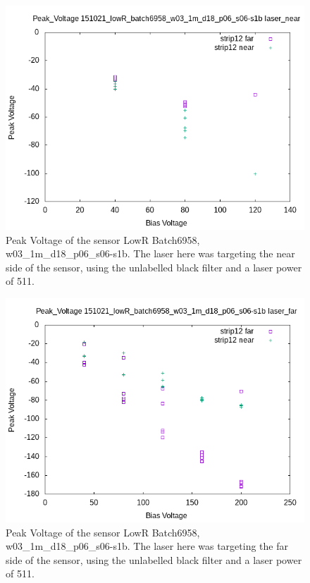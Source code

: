 \documentclass{report}
\begin{document}
            \begin{figure}[h] 
                \includegraphics[height=.4\textheight]{Peak_Voltage__151021_lowR_batch6958_w03_1m_d18_p06_s06-s1b__laser_near}
                \centering
                \caption{ Peak Voltage of the sensor LowR Batch6958, w03\_1m\_d18\_p06\_s06-s1b. The laser here was targeting the near side of the sensor, using the unlabelled black filter and a laser power of 511. }
                \label{fig:Peak_Voltage__151021_lowR_batch6958_w03_1m_d18_p06_s06-s1b__laser_near}
            \end{figure}

            \begin{figure}[h] 
                \includegraphics[height=.4\textheight]{Peak_Voltage__151021_lowR_batch6958_w03_1m_d18_p06_s06-s1b__laser_far}
                \centering
                \caption{ Peak Voltage of the sensor LowR Batch6958, w03\_1m\_d18\_p06\_s06-s1b. The laser here was targeting the far side of the sensor, using the unlabelled black filter and a laser power of 511. }
                \label{fig:Peak_Voltage__151021_lowR_batch6958_w03_1m_d18_p06_s06-s1b__laser_far}
            \end{figure}
\end{document}
